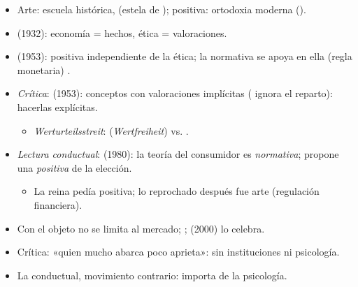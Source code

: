 \documentclass{article}
\begin{document}
\begin{columnas}
\begin{center}
\end{center}
\begin{itemize}
\item Arte: escuela histórica,  (estela de ); positiva: ortodoxia moderna ().
\end{itemize}
\begin{itemize}
\item {} (1932): economía = hechos, ética = valoraciones.
\item {} (1953): positiva independiente de la ética; la normativa se apoya en ella (regla monetaria) .
\item \emph{Crítica}:  (1953): conceptos con valoraciones implícitas ( ignora el reparto): hacerlas explícitas.
  \begin{itemize}
  \item \emph{Werturteilsstreit}:  (\emph{Wertfreiheit}) vs. .
  \end{itemize}
\item \emph{Lectura conductual}:  (1980): la teoría del consumidor es \emph{normativa}; propone una \emph{positiva} de la elección.
  \begin{itemize}
  \item La reina pedía positiva; lo reprochado después fue arte (regulación financiera).
  \end{itemize}
\end{itemize}
\begin{itemize}
\item Con  el objeto no se limita al mercado;  ;  (2000) lo celebra.
\item Crítica: «quien mucho abarca poco aprieta»: sin instituciones ni psicología.
\item La conductual, movimiento contrario: importa de la psicología.
\end{itemize}


\end{columnas}
\end{document}
